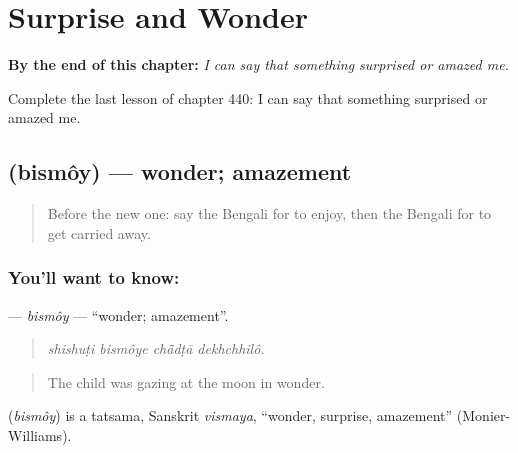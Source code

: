 
\chapter{Surprise and Wonder}
\label{ch:bn-surprise-and-wonder}

\begin{chapteropening}
\textbf{By the end of this chapter:} \emph{I can say that something surprised or amazed me.}

Complete the last lesson of chapter 440: I can say that something surprised or amazed me.
\end{chapteropening}

\section[\texorpdfstring{\bn{বিস্ময়} (bismôy)}{বিস্ময় (bismôy)}]{ (bismôy) — wonder; amazement}

\label{lesson:BN-C440-bismoy}



\begin{quote}
Before the new one: say the Bengali for to enjoy, then the Bengali for to get carried away.
\end{quote}

\subsection*{You'll want to know: }
\textbf{} — \emph{bismôy} — \textquotedblleft{}wonder; amazement\textquotedblright{}.

\begin{quote}
   
\end{quote}

\begin{quote}
\emph{shishuṭi bismôye chā̃dṭā dekhchhilô.}
\end{quote}

\begin{quote}
The child was gazing at the moon in wonder.
\end{quote}

\begin{cousinweb}
\textbf{} (\emph{bismôy}) is a tatsama, Sanskrit \emph{vismaya}, \textquotedblleft{}wonder, surprise, amazement\textquotedblright{} (Monier-Williams).
\end{cousinweb}


